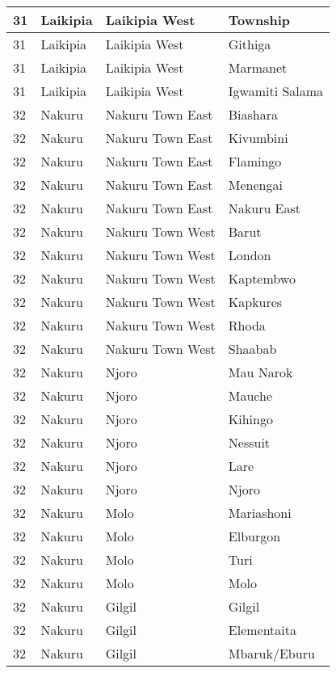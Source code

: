 \begin{table}[!ht]
\begin{tabular}{|l|l|l|l|}
        31 & Laikipia & Laikipia West & Township \\ \hline
        31 & Laikipia & Laikipia West & Githiga \\ \hline
        31 & Laikipia & Laikipia West & Marmanet \\ \hline
        31 & Laikipia & Laikipia West & Igwamiti Salama \\ \hline
        32 & Nakuru & Nakuru Town East & Biashara \\ \hline
        32 & Nakuru & Nakuru Town East & Kivumbini \\ \hline
        32 & Nakuru & Nakuru Town East & Flamingo \\ \hline
        32 & Nakuru & Nakuru Town East & Menengai \\ \hline
        32 & Nakuru & Nakuru Town East & Nakuru East \\ \hline
        32 & Nakuru & Nakuru Town West & Barut \\ \hline
        32 & Nakuru & Nakuru Town West & London \\ \hline
        32 & Nakuru & Nakuru Town West & Kaptembwo \\ \hline
        32 & Nakuru & Nakuru Town West & Kapkures \\ \hline
        32 & Nakuru & Nakuru Town West & Rhoda \\ \hline
        32 & Nakuru & Nakuru Town West & Shaabab \\ \hline
        32 & Nakuru & Njoro & Mau Narok \\ \hline
        32 & Nakuru & Njoro & Mauche \\ \hline
        32 & Nakuru & Njoro & Kihingo \\ \hline
        32 & Nakuru & Njoro & Nessuit \\ \hline
        32 & Nakuru & Njoro & Lare \\ \hline
        32 & Nakuru & Njoro & Njoro \\ \hline
        32 & Nakuru & Molo & Mariashoni \\ \hline
        32 & Nakuru & Molo & Elburgon \\ \hline
        32 & Nakuru & Molo & Turi \\ \hline
        32 & Nakuru & Molo & Molo \\ \hline
        32 & Nakuru & Gilgil & Gilgil \\ \hline
        32 & Nakuru & Gilgil & Elementaita \\ \hline
        32 & Nakuru & Gilgil & Mbaruk/Eburu \\ \hline

\end{tabular}
\end{table}
